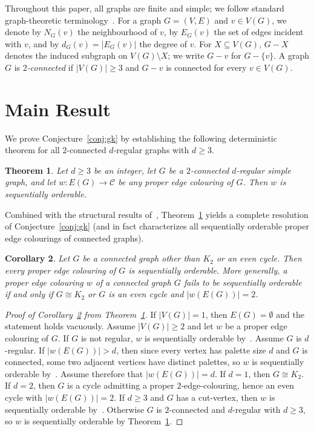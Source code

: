 \documentclass[11pt,a4paper]{article}
\newtheorem{theorem}{Theorem}
\newtheorem{corollary}[theorem]{Corollary}
\begin{document}
Throughout this paper, all graphs are finite and simple; we follow standard graph-theoretic terminology~\cite{Diestel2016}. For a graph $G = (V, E)$ and $v \in V(G)$, we denote by $N_G(v)$ the neighbourhood of $v$, by $E_G(v)$ the set of edges incident with $v$, and by $d_G(v) = |E_G(v)|$ the degree of $v$. For $X \subseteq V(G)$, $G - X$ denotes the induced subgraph on $V(G) \setminus X$; we write $G - v$ for $G - \{v\}$. A graph $G$ is \emph{$2$-connected} if $|V(G)| \ge 3$ and $G - v$ is connected for every $v \in V(G)$.

\section{Main Result}

We prove Conjecture~\ref{conj:gk} by establishing the following deterministic theorem for all $2$-connected $d$-regular graphs with $d \ge 3$.

\begin{theorem}
\label{thm:regular}
Let $d \ge 3$ be an integer, let $G$ be a $2$-connected $d$-regular simple graph, and let $w : E(G) \to \mathcal{C}$ be any proper edge colouring of $G$. Then $w$ is sequentially orderable.
\end{theorem}

Combined with the structural results of~\cite{GK2026}, Theorem~\ref{thm:regular} yields a complete resolution of Conjecture~\ref{conj:gk} (and in fact characterizes all sequentially orderable proper edge colourings of connected graphs).

\begin{corollary}
\label{cor:main}
Let $G$ be a connected graph other than $K_2$ or an even cycle. Then every proper edge colouring of $G$ is sequentially orderable. More generally, a proper edge colouring $w$ of a connected graph $G$ fails to be sequentially orderable if and only if $G \cong K_2$ or $G$ is an even cycle and $|w(E(G))| = 2$.
\end{corollary}

\begin{proof}[Proof of Corollary~\ref{cor:main} from Theorem~\ref{thm:regular}]
If $|V(G)| = 1$, then $E(G) = \emptyset$ and the statement holds vacuously. Assume $|V(G)| \ge 2$ and let $w$ be a proper edge colouring of $G$. If $G$ is not regular, $w$ is sequentially orderable by~\cite[Corollary~6]{GK2026}. Assume $G$ is $d$-regular. If $|w(E(G))| > d$, then since every vertex has palette size $d$ and $G$ is connected, some two adjacent vertices have distinct palettes, so $w$ is sequentially orderable by~\cite[Theorem~5]{GK2026}. Assume therefore that $|w(E(G))| = d$. If $d = 1$, then $G \cong K_2$. If $d = 2$, then $G$ is a cycle admitting a proper $2$-edge-colouring, hence an even cycle with $|w(E(G))| = 2$. If $d \ge 3$ and $G$ has a cut-vertex, then $w$ is sequentially orderable by~\cite[Lemma~4]{GK2026}. Otherwise $G$ is $2$-connected and $d$-regular with $d \ge 3$, so $w$ is sequentially orderable by Theorem~\ref{thm:regular}.
\end{proof}
\end{document}

